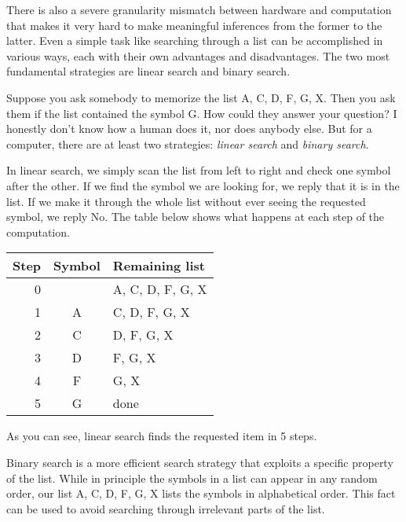 There is also a severe granularity mismatch between hardware and computation that makes it very hard to make meaningful inferences from the former to the latter.
Even a simple task like searching through a list can be accomplished in various ways, each with their own advantages and disadvantages.
The two most fundamental strategies are linear search and binary search.
%
\begin{examplebox}
    Suppose you ask somebody to memorize the list A, C, D, F, G, X\@.
    Then you ask them if the list contained the symbol G\@.
    How could they answer your question?
    I honestly don't know how a human does it, nor does anybody else.
    But for a computer, there are at least two strategies: \emph{linear search} and \emph{binary search}.

    In linear search, we simply scan the list from left to right and check one symbol after the other.
    If we find the symbol we are looking for, we reply that it is in the list.
    If we make it through the whole list without ever seeing the requested symbol, we reply No.
    The table below shows what happens at each step of the computation.
    \begin{center}
        \begin{tabular}{rcl}
            \toprule
            \textbf{Step} & \textbf{Symbol} & \textbf{Remaining list}\\
            \midrule
            0 &   & A, C, D, F, G, X\\
            1 & A & C, D, F, G, X\\
            2 & C & D, F, G, X\\
            3 & D & F, G, X\\
            4 & F & G, X\\
            5 & G & done\\
            \bottomrule
        \end{tabular}
    \end{center}
    As you can see, linear search finds the requested item in 5 steps.

    Binary search is a more efficient search strategy that exploits a specific property of the list.
    While in principle the symbols in a list can appear in any random order, our list A, C, D, F, G, X lists the symbols in alphabetical order.
    This fact can be used to avoid searching through irrelevant parts of the list.


\end{examplebox}
